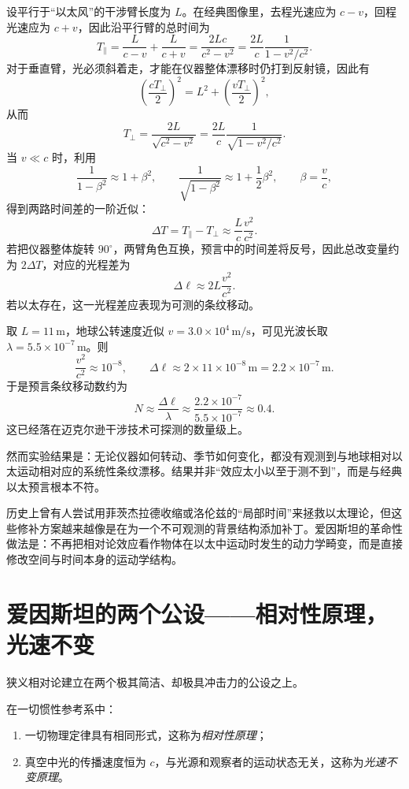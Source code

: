 设平行于“以太风”的干涉臂长度为 $L$。在经典图像里，去程光速应为 $c-v$，回程光速应为 $c+v$，因此沿平行臂的总时间为
\[
T_{\parallel}=\frac{L}{c-v}+\frac{L}{c+v}=\frac{2Lc}{c^2-v^2}=\frac{2L}{c}\frac{1}{1-v^2/c^2}.
\]
对于垂直臂，光必须斜着走，才能在仪器整体漂移时仍打到反射镜，因此有
\[
\left(\frac{cT_{\perp}}{2}\right)^2=L^2+\left(\frac{vT_{\perp}}{2}\right)^2,
\]
从而
\[
T_{\perp}=\frac{2L}{\sqrt{c^2-v^2}}=\frac{2L}{c}\frac{1}{\sqrt{1-v^2/c^2}}.
\]
当 $v\ll c$ 时，利用
\[
\frac{1}{1-\beta^2}\approx 1+\beta^2,
\qquad
\frac{1}{\sqrt{1-\beta^2}}\approx 1+\frac12\beta^2,
\qquad \beta=\frac{v}{c},
\]
得到两路时间差的一阶近似：
\[
\Delta T=T_{\parallel}-T_{\perp}\approx \frac{L}{c}\frac{v^2}{c^2}.
\]
若把仪器整体旋转 $90^\circ$，两臂角色互换，预言中的时间差将反号，因此总改变量约为 $2\Delta T$，对应的光程差为
\[
\Delta \ell \approx 2L\frac{v^2}{c^2}.
\]
若以太存在，这一光程差应表现为可测的条纹移动。

\begin{example}[经典以太模型下的条纹移动估计]
取 $L=11\,\mathrm{m}$，地球公转速度近似 $v=3.0\times 10^4\,\mathrm{m/s}$，可见光波长取 $\lambda=5.5\times 10^{-7}\,\mathrm{m}$。则
\[
\frac{v^2}{c^2}\approx 10^{-8},
\qquad
\Delta \ell\approx 2\times 11\times 10^{-8}\,\mathrm{m}=2.2\times 10^{-7}\,\mathrm{m}.
\]
于是预言条纹移动数约为
\[
N\approx \frac{\Delta \ell}{\lambda}\approx \frac{2.2\times 10^{-7}}{5.5\times 10^{-7}}\approx 0.4.
\]
这已经落在迈克尔逊干涉技术可探测的数量级上。
\end{example}

然而实验结果是：无论仪器如何转动、季节如何变化，都没有观测到与地球相对以太运动相对应的系统性条纹漂移。结果并非“效应太小以至于测不到”，而是与经典以太预言根本不符。

\begin{remark}
历史上曾有人尝试用菲茨杰拉德收缩或洛伦兹的“局部时间”来拯救以太理论，但这些修补方案越来越像是在为一个不可观测的背景结构添加补丁。爱因斯坦的革命性做法是：不再把相对论效应看作物体在以太中运动时发生的动力学畸变，而是直接修改空间与时间本身的运动学结构。
\end{remark}

\section{爱因斯坦的两个公设——相对性原理，光速不变}

狭义相对论建立在两个极其简洁、却极具冲击力的公设之上。

\begin{law}[爱因斯坦的两个公设]
在一切惯性参考系中：
\begin{enumerate}
  \item 一切物理定律具有相同形式，这称为\emph{相对性原理}；
  \item 真空中光的传播速度恒为 $c$，与光源和观察者的运动状态无关，这称为\emph{光速不变原理}。
\end{enumerate}
\end{law}

